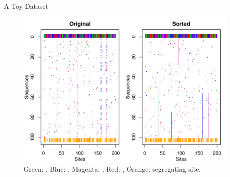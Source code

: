 \documentclass{beamer}
\begin{document}
\begin{frame}{A Toy Dataset}

\vspace{-0.5cm}
\begin{figure}
  \includegraphics[width=4.3in]{./graph/seq-2_dot}
  \\
  {\tiny Green: , Blue: , Magenta: , Red: ,
         Orange: segregating site.}
\end{figure}

\end{frame}

\end{document}
